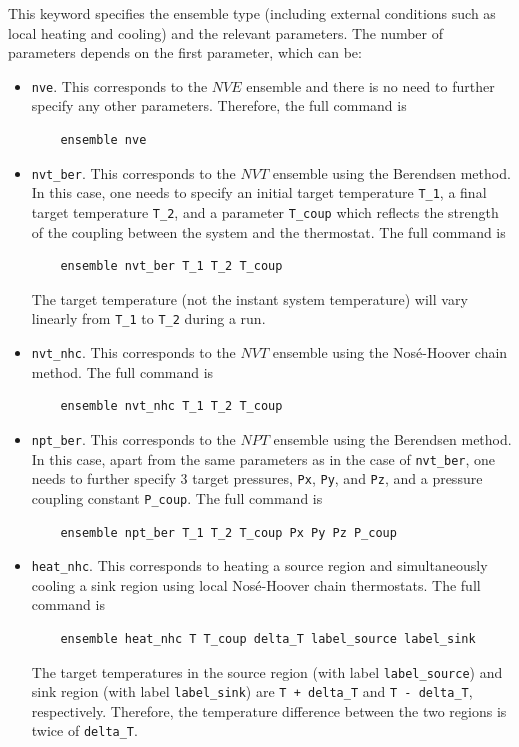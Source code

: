 \documentclass[12pt,a4paper]{report}
\begin{document}
This keyword specifies the ensemble type (including external conditions such as local heating and cooling) and the relevant parameters. The number of parameters depends on the first parameter, which can be:
\begin{itemize}

\item \verb"nve". This corresponds to the $NVE$ ensemble and there is no need to further specify any other parameters. Therefore, the full command is
\begin{verbatim}
    ensemble nve
\end{verbatim}

\item \verb"nvt_ber". This corresponds to the $NVT$ ensemble using the Berendsen method. In this case, one needs to specify an initial target temperature \verb"T_1", a final target temperature \verb"T_2", and a parameter \verb"T_coup" which reflects the strength of the coupling between the system and the thermostat. The full command is
\begin{verbatim}
    ensemble nvt_ber T_1 T_2 T_coup
\end{verbatim}
The target temperature (not the instant system temperature) will vary linearly from \verb"T_1" to \verb"T_2" during a run.

\item \verb"nvt_nhc". This corresponds to the $NVT$ ensemble using the Nos\'{e}-Hoover chain method. The full command is
\begin{verbatim}
    ensemble nvt_nhc T_1 T_2 T_coup
\end{verbatim}

\item \verb"npt_ber". This corresponds to the $NPT$ ensemble using the Berendsen method. In this case, apart from the same parameters as in the case of \verb"nvt_ber", one needs to further specify 3 target pressures, \verb"Px", \verb"Py", and \verb"Pz", and a pressure coupling constant \verb"P_coup". The full command is
\begin{verbatim}
    ensemble npt_ber T_1 T_2 T_coup Px Py Pz P_coup
\end{verbatim}

\item \verb"heat_nhc". This corresponds to heating a source region and simultaneously cooling a sink region using local Nos\'{e}-Hoover chain thermostats. The full command is
\begin{verbatim}
    ensemble heat_nhc T T_coup delta_T label_source label_sink
\end{verbatim}
The target temperatures in the source region (with label \verb"label_source") and sink region (with label \verb"label_sink") are \verb"T + delta_T" and \verb"T - delta_T", respectively. Therefore, the temperature difference between the two regions is twice of \verb"delta_T".

\end{itemize}
\end{document}
